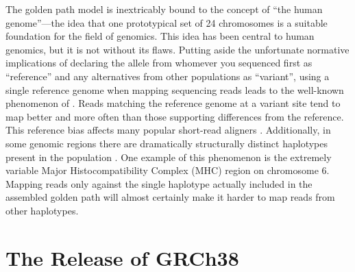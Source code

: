 \documentclass[11pt,proposal]{ucthesis}
\begin{document}
The golden path model is inextricably bound to the concept of ``the human genome''---the idea that one prototypical set of 24 chromosomes is a suitable foundation for the field of genomics. This idea has been central to human genomics, but it is not without its flaws. Putting aside the unfortunate normative implications of declaring the allele from whomever you sequenced first as ``reference'' and any alternatives from other populations as ``variant'', using a single reference genome when mapping sequencing reads leads to the well-known phenomenon of . Reads matching the reference genome at a variant site tend to map better and more often than those supporting differences from the reference. This reference bias affects many popular short-read aligners \cite{lunter2011stampy}. Additionally, in some genomic regions there are dramatically structurally distinct haplotypes present in the population \cite{church2011modernizing}. One example of this phenomenon is the extremely variable Major Histocompatibility Complex (MHC) region on chromosome 6. Mapping reads only against the single haplotype actually included in the assembled golden path will almost certainly make it harder to map reads from other haplotypes.


     
     
     
        
     
     
        

\section{The Release of GRCh38}
\end{document}
